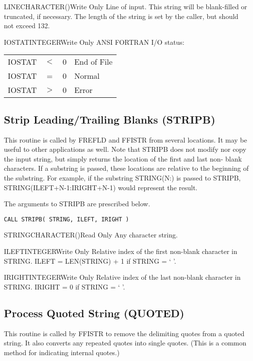 \begin{argy}{LINE}{CHARACTER\last(\last)}{Write Only}
Line of input.  This string will be blank-filled or
truncated, if necessary.  The length of the string is
set by the caller, but should not exceed 132.
\end{argy}

\begin{argy}{IOSTAT}{INTEGER}{Write Only}
ANSI FORTRAN I/O status:\\
\begin{tabular}{cccl}
IOSTAT &$<$ & 0 & End of File\\
IOSTAT &=   & 0 & Normal\\
IOSTAT &$>$ & 0 & Error\\
\end{tabular}
\end{argy}

\subsection{Strip Leading/Trailing Blanks (STRIPB)}\label{sec:stripb}
This routine is called by FREFLD and FFISTR from several locations.  It may
be useful to other applications as well.  Note that STRIPB does not modify
nor copy the input string, but simply returns the location of the first and
last non- blank characters.  If a substring is passed, these locations are
relative to the beginning of the substring.  For example, if the substring
STRING(N:) is passed to STRIPB, STRING(ILEFT+N-1:IRIGHT+N-1) would represent
the result.

The arguments to STRIPB are prescribed below.

\verb+CALL STRIPB( STRING, ILEFT, IRIGHT )+

\begin{argy}{STRING}{CHARACTER\last(\last)}{Read Only}
Any character string.
\end{argy}

\begin{argy}{ILEFT}{INTEGER}{Write Only}
Relative index of the first non-blank character in
STRING.  ILEFT = LEN(STRING) + 1 if STRING = ` '.
\end{argy}

\begin{argy}{IRIGHT}{INTEGER}{Write Only}
Relative index of the last non-blank character in
STRING.  IRIGHT = 0 if STRING = ` '.
\end{argy}

\subsection{Process Quoted String (QUOTED)}\label{sec:quoted}
This routine is called by FFISTR to remove the delimiting quotes from a
quoted string. It also converts any repeated quotes into single quotes.
(This is a common method for indicating internal quotes.)

